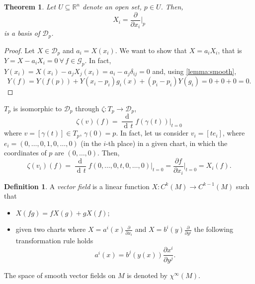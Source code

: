 \documentclass[a4paper,12pt]{book}
\newcommand{\dd}{\mathop{\mathrm{d}\!}{}}
\newtheorem{theorem}{Theorem}
\theoremstyle{definition}
\newtheorem{definition}{Definition}
\theoremstyle{remark}
\begin{document}
\begin{theorem}
Let $U\subseteq\mathbb R^n$ denote an open set, $p\in U$. Then,
\[X_i=\frac{\partial}{\partial x_i}\bigg|_p\]
is a basis of $\mathcal D_p$.
\end{theorem}
\begin{proof}
Let $X\in\mathcal D_p$ and $a_i=X(x_i)$. We want to show that $X=a_iX_i$, that is $Y=X-a_iX_i=0\ \forall\,f\in\mathcal G_p$. In fact, $Y(x_i)=X(x_i)-a_jX_j(x_i)=a_i-a_j\delta_{ij}=0$ and, using \cref{lemma:smooth},
\[Y(f)=Y(f(p))+Y(x_i-p_i)g_i(x)+(p_i-p_i)Y(g_i)=0+0+0=0.\]
\end{proof}

$T_p$ is isomorphic to $\mathcal D_p$ through $\zeta\colon T_p\to\mathcal D_p$,
\[\zeta(v)(f)=\frac{\dd}{\dd t}f(\gamma(t))\bigg|_{t=0}\]
where $v=[\gamma(t)]\in T_p$, $\gamma(0)=p$. In fact, let us consider $v_i=[te_i]$, where $e_i=(0,\ldots,0,1,0,\ldots,0)$ (in the $i$-th place) in a given chart, in which the coordinates of $p$ are $(0,\ldots,0)$. Then,
\[\zeta(v_i)(f)=\frac{\dd}{\dd t}f(0,\ldots,0,t,0,\ldots,0)\bigg|_{t=0}=\frac{\partial f}{\partial x_i}\bigg|_{t=0}=X_i(f).\]

\begin{definition}
A \emph{vector field} is a linear function $X\colon C^k(M)\to C^{k-1}(M)$ such that
\begin{itemize}
\item $X(fg)=fX(g)+gX(f)$;
\item given two charts where $X=a^i(x)\frac{\partial}{\partial x_i}$ and $X=b^i(y)\frac{\partial}{\partial y^i}$ the following transformation rule holds
\[a^i(x)=b^j(y(x))\frac{\partial x^i}{\partial y^j}.\]
\end{itemize}
The space of smooth vector fields on $M$ is denoted by $\chi^\infty(M)$.
\end{definition}
\end{document}

